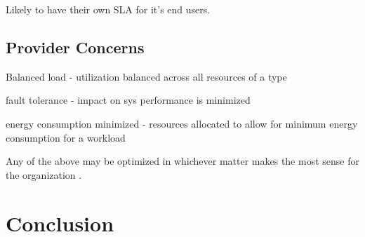 \documentclass[fullapage,12pt]{article}
\begin{document}
\cite{Jennings2015}
Likely to have their own SLA for it's end users.


\subsection{Provider Concerns} \label{provider-concerns}



Balanced load - utilization balanced across all resources of a type

fault tolerance - impact on sys performance is minimized

energy consumption minimized - resources allocated to allow for minimum energy consumption for a workload

Any of the above may be optimized in whichever matter makes the most sense for the organization \cite{Jennings2015}.




\section{Conclusion} \label{sec:conclusion}


\printbibliography
\end{document}
